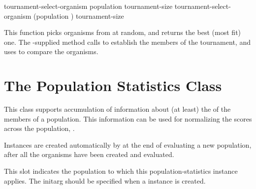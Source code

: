 {	\filbreak
	{\samepage
		\Defgeneric tournament-select-organism {population tournament-size}
		 tournament-select-organism {(population ) tournament-size}
		
		This function picks  organisms from  at random, and
		returns the best (most fit) one. The \geco-supplied method calls
		 to establish the members of the
		tournament, and uses  to compare the organisms.
		\par}%
	\filbreak
	
	
	\section{The Population Statistics Class} \label{sec:pop-stats-class}
	
	This class supports accumulation of information about (at least) the 
	of the members of a population. This information can be used for
	normalizing the scores across the population, \etc.
	
	Instances are created automatically by \geco{} at the end of evaluating
	a new population, after all the organisms have been created and evaluated.
	
	\filbreak
	{\samepage
		
		\gap
		
		
		
		This slot indicates the population to which this population-statistics
		instance applies.  The  initarg should be specified when
		a  instance is created.
		\par}%
	
	\filbreak
	{\samepage
		\par}%
	
	\filbreak
	{\samepage
		\par}%
	
	\filbreak
	{\samepage
		\par}%
	
}
